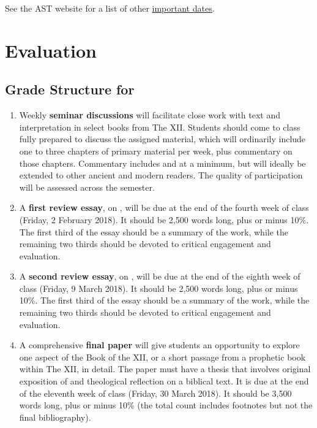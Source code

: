 \documentclass[titlepage]{article}
\begin{document}
See the AST website for a list of other \href{http://www.astheology.ns.ca/students/academic-dates.html}{important dates}.

\section{Evaluation}
\label{evaluation}

\subsection{Grade Structure for \ccode}
\label{structure}

\begin{enumerate}

	\item Weekly \textbf{seminar discussions} will facilitate close work
	with text and interpretation in select books from The XII.  Students
	should come to class fully prepared to discuss the assigned
	material, which will ordinarily include one to three chapters of
	primary material per week, plus commentary on those chapters.
	Commentary includes \cite{Jerome1} and \cite{Theodoret} at a
	minimum, but will ideally be extended to other ancient and modern
	readers. The quality of participation will be assessed across the
	semester.

	\item A \textbf{first review essay}, on \cite{Two}, will be due at
	the end of the fourth week of class (Friday, 2 February 2018). It
	should be 2,500 words long, plus or minus 10\%. The first third of
	the essay should be a summary of the work, while the remaining two
	thirds should be devoted to critical engagement and evaluation.

	\item A \textbf{second review essay}, on \cite{Seitz}, will be due
	at the end of the eighth week of class (Friday, 9 March 2018). It
	should be 2,500 words long, plus or minus 10\%. The first third of
	the essay should be a summary of the work, while the remaining two
	thirds should be devoted to critical engagement and evaluation.

	\item A comprehensive \textbf{final paper} will give students an
	opportunity to explore one aspect of the Book of the XII, or a short
	passage from a prophetic book within The XII, in detail. The paper
	must have a thesis that involves original exposition of and
	theological reflection on a biblical text. It is due at the end of
	the eleventh week of class (Friday, 30 March 2018). It should be
	3,500 words long, plus or minus 10\% (the total count includes
	footnotes but not the final bibliography).

\end{enumerate}
\end{document}
